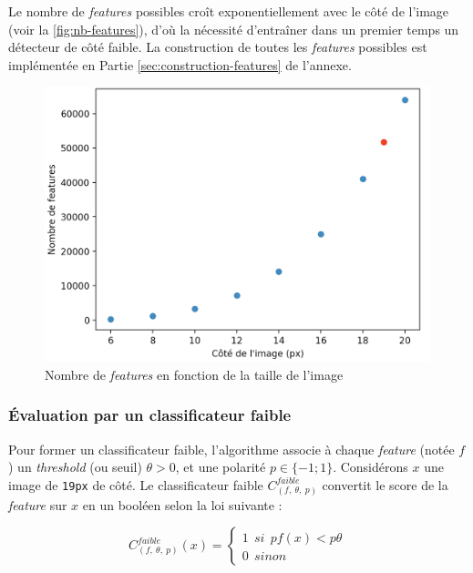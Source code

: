 \documentclass[12pt,a4paper]{article}
\begin{document}
Le nombre de \textit{features} possibles croît exponentiellement avec le côté de l'image (voir la \autoref{fig:nb-features}), d'où la nécessité d'entraîner dans un premier temps un détecteur de côté faible. La construction de toutes les \textit{features} possibles est implémentée en Partie \ref{sec:construction-features} de l'annexe.

\begin{figure}
        \includegraphics[scale = 0.35]{nombre_features_cut}
        \centering
        \caption{Nombre de \textit{features} en fonction de la taille de l'image}
        \label{fig:nb-features}
\end{figure}

\subsubsection{Évaluation par un classificateur faible}
Pour former un classificateur faible, l'algorithme associe à chaque \textit{feature} (notée $f$) un \textit{threshold} (ou seuil) $\theta > 0$, et une polarité $p \in \{-1 ; 1\}$. Considérons $x$ une image de \texttt{19px} de côté. Le classificateur faible $C_{(f, \: \theta, \: p)}^{faible}$ convertit le score de la \textit{feature} sur $x$ en un booléen selon la loi suivante :

\begin{equation}
    C_{(f, \: \theta, \: p)}^{faible}(x) = 
        \begin{cases}
        1 \:\: si \:\: pf(x) < p\theta \\
        0 \:\: sinon
        \end{cases}
\end{equation}
\end{document}
